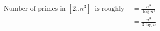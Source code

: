 \documentclass[preview]{standalone}
\begin{document}
\begin{align*}
\text{Number of primes in } [2..n^3]  \
                       \text{ is roughly } &=\frac{n^3}{\log n^3} \\ \
                       &= \frac{n^3}{3 \log n}
\end{align*}
\end{document}
